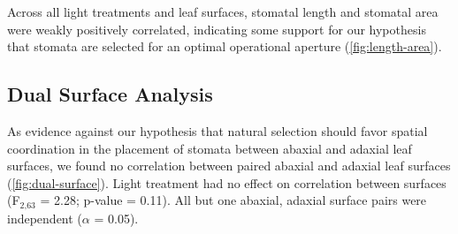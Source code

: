 \documentclass[12pt,halfline,a4paper,]{ouparticle}
\begin{document}
Across all light treatments and leaf surfaces, stomatal length and
stomatal area were weakly positively correlated, indicating some support
for our hypothesis that stomata are selected for an optimal operational
aperture (\autoref{fig:length-area}).

\hypertarget{dual-surface-analysis}{%
\subsection{Dual Surface Analysis}\label{dual-surface-analysis}}

As evidence against our hypothesis that natural selection should favor
spatial coordination in the placement of stomata between abaxial and
adaxial leaf surfaces, we found no correlation between paired abaxial
and adaxial leaf surfaces (\autoref{fig:dual-surface}). Light treatment
had no effect on correlation between surfaces (F\(_\text{2,63}\) = 2.28;
p-value = 0.11). All but one abaxial, adaxial surface pairs were
independent (\(\alpha\) = 0.05).
\end{document}
